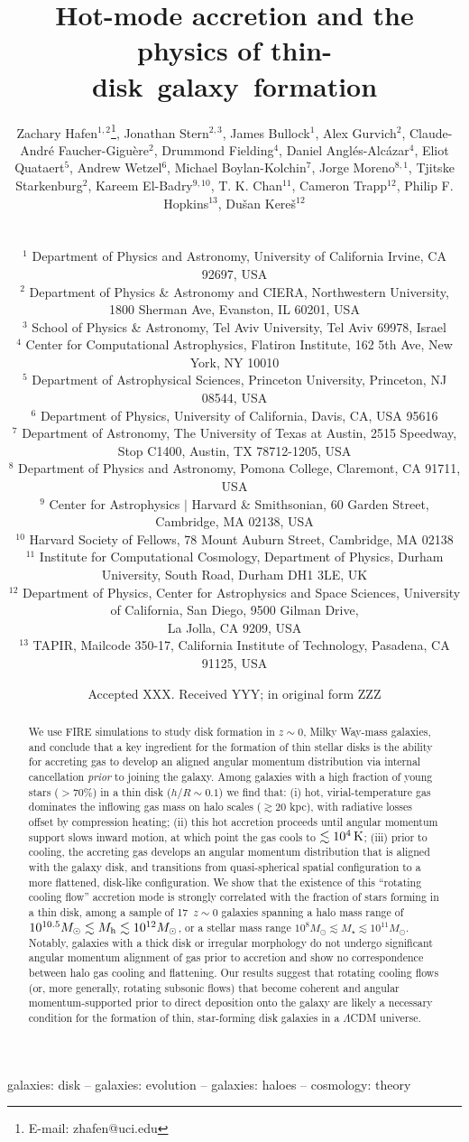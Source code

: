 \documentclass[fleqn,usenatbib]{mnras}
\title[Rotating cooling flows and thin galactic disks]{Hot-mode accretion and the physics of thin-disk~galaxy~formation}
\author[Hafen, Stern, Bullock et al.]{
\parbox{\textwidth}{
Zachary Hafen$^{1,2}$\thanks{E-mail: zhafen@uci.edu},
Jonathan Stern$^{2,3}$,
James Bullock$^{1}$,
Alex Gurvich$^2$,
Claude-Andr\'e Faucher-Gigu\`ere$^2$,
Drummond Fielding$^4$,
Daniel Angl\'es-Alc\'azar$^4$,
Eliot Quataert$^5$,
Andrew Wetzel$^6$,
Michael Boylan-Kolchin$^7$,
Jorge Moreno$^{8,1}$,
Tjitske Starkenburg$^2$,
Kareem El-Badry$^{9,10}$,
T. K. Chan$^{11}$,
Cameron Trapp$^{12}$,
Philip F. Hopkins$^{13}$,
Du\v{s}an Kere\v{s}$^{12}$
} \vspace{0.4cm}\\
\parbox{\textwidth}{
$^1$ Department of Physics and Astronomy, University of California Irvine, CA 92697, USA \\
$^2$ Department of Physics \& Astronomy and CIERA, Northwestern University, 1800 Sherman Ave, Evanston, IL 60201, USA \\
$^3$ School of Physics \& Astronomy, Tel Aviv University, Tel Aviv 69978, Israel \\
$^4$ Center for Computational Astrophysics, Flatiron Institute, 162 5th Ave, New York, NY 10010 \\
$^5$ Department of Astrophysical Sciences, Princeton University, Princeton, NJ 08544, USA \\
$^6$ Department of Physics, University of California, Davis, CA, USA 95616 \\
$^7$ Department of Astronomy, The University of Texas at Austin, 2515 Speedway, Stop C1400, Austin, TX 78712-1205, USA \\
$^8$ Department of Physics and Astronomy, Pomona College, Claremont, CA 91711, USA \\
$^9$ Center for Astrophysics $|$ Harvard \& Smithsonian, 60 Garden Street, Cambridge, MA 02138, USA \\
$^{10}$ Harvard Society of Fellows, 78 Mount Auburn Street, Cambridge, MA 02138 \\
$^{11}$ Institute for Computational Cosmology, Department of Physics, Durham University, South Road, Durham DH1 3LE, UK \\
$^{12}$ Department of Physics, Center for Astrophysics and Space Sciences, University of California, San Diego, 9500 Gilman Drive, \\ La Jolla, CA 9209, USA \\
$^{13}$ TAPIR, Mailcode 350-17, California Institute of Technology, Pasadena, CA 91125, USA
}
}
\date{Accepted XXX. Received YYY; in original form ZZZ}
\newcommand{\Nsample}{17}
\begin{document}
\label{firstpage}
\pagerange{\pageref{firstpage}--\pageref{lastpage}}
\maketitle

\begin{abstract}
We use FIRE simulations to study disk formation in $z\sim 0$, Milky Way-mass galaxies, and conclude that a key ingredient for the formation of thin stellar disks is the ability for accreting gas to develop an aligned angular momentum distribution via internal cancellation \textit{prior} to joining the galaxy.
Among galaxies with a high fraction of young stars ($>70\%$) in a thin disk ($h/R \sim 0.1$) we find that:
(i) hot, virial-temperature gas dominates the inflowing gas mass on halo scales ($\gtrsim 20$ kpc), with radiative losses offset by compression heating;
(ii) this hot accretion proceeds until angular momentum support slows inward motion, at which point the gas cools to $\lesssim10^4\,{\rm K}$;
(iii) prior to cooling, the accreting gas develops an angular momentum distribution that is aligned with the galaxy disk, and transitions from quasi-spherical spatial configuration to a more flattened, disk-like configuration.
We show that the existence of this ``rotating cooling flow'' accretion mode is strongly correlated with the fraction of stars forming in a thin disk, among a sample of \Nsample\ $z\sim0$ galaxies spanning a halo mass range of $10^{10.5} M_\odot \lesssim M_{\rm h} \lesssim 10^{12} M_\odot$, or a stellar mass range $10^8 M_\odot \lesssim M_\star \lesssim 10^{11} M_\odot$.
Notably, galaxies with a thick disk or irregular morphology do not undergo significant angular momentum alignment of gas prior to accretion and show no correspondence between halo gas cooling and flattening.
Our results suggest that rotating cooling flows (or, more generally, rotating subsonic flows) that become coherent and angular momentum-supported prior to direct deposition onto the galaxy are likely a necessary condition for the formation of thin, star-forming disk galaxies in a $\Lambda$CDM universe.
\end{abstract}

\begin{keywords}
galaxies: disk -- galaxies: evolution -- galaxies: haloes -- cosmology: theory
\end{keywords}
\end{document}
